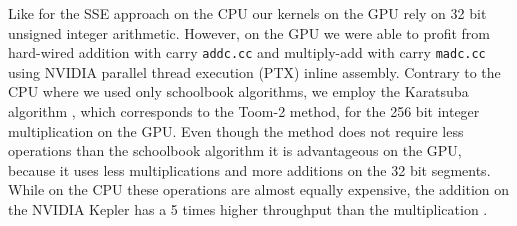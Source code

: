 \documentclass[oribibl,a4paper]{llncs2e/llncs}
\begin{document}
Like for the SSE approach on the CPU our kernels on the GPU rely on 32 bit unsigned integer arithmetic.
However, on the GPU we were able to profit from hard-wired addition with carry \verb|addc.cc| and multiply-add with carry \verb|madc.cc| using NVIDIA parallel thread execution (PTX) inline assembly.
Contrary to the CPU where we used only schoolbook algorithms, we employ the Karatsuba algorithm \cite{karatsuba1963}, which corresponds to the Toom-2 method, for the 256 bit integer multiplication on the GPU.
Even though the method does not require less operations than the schoolbook algorithm it is advantageous on the GPU, because it uses less multiplications and more additions on the 32 bit segments.
While on the CPU these operations are almost equally expensive, the addition on the NVIDIA Kepler has a 5 times higher throughput than the multiplication \cite{CUDAProgramming}.
\end{document}
